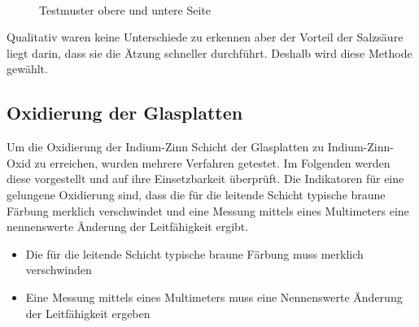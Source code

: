 \begin{figure}[t]
  \centering
~
 \caption{Testmuster obere und untere Seite}
  \label{testmuster_seiten}
 \end{figure}

Qualitativ waren keine Unterschiede zu erkennen aber der Vorteil der Salzsäure liegt darin, dass sie die Ätzung schneller durchführt. Deshalb wird diese Methode gewählt.

\subsection{Oxidierung der Glasplatten}


Um die Oxidierung der Indium-Zinn Schicht der Glasplatten zu Indium-Zinn-Oxid zu erreichen, wurden mehrere Verfahren getestet. Im Folgenden werden diese vorgestellt und auf ihre Einsetzbarkeit überprüft.
Die Indikatoren für eine gelungene Oxidierung sind, dass die für die leitende Schicht typische braune Färbung merklich verschwindet und eine Messung mittels eines Multimeters eine nennenswerte Änderung der Leitfähigkeit ergibt.


\begin{itemize}
\item Die für die leitende Schicht typische braune Färbung muss merklich verschwinden
\item Eine Messung mittels eines Multimeters muss eine Nennenswerte Änderung der Leitfähigkeit ergeben\\
\end{itemize}

